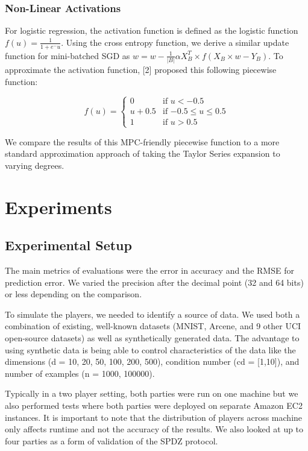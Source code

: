 \documentclass{article}
\begin{document}
\subsubsection{Non-Linear Activations}

For logistic regression, the activation function is defined as the logistic function $f(u) = \frac{1}{1+e^-u}$. Using the cross entropy function, we derive a similar update function for mini-batched SGD as $ w = w - \frac{1}{|B|} \alpha X^{T}_{B} \times f(X_{B} \times w - Y_{B})$. To approximate the activation function, [2] proposed this following piecewise function:

\[
  f(u) =
  \begin{cases}
                                   0 & \text{if $u < -0.5$} \\
                                   u + 0.5 & \text{if $-0.5 \leq u \leq 0.5$} \\
1 & \text{if $u > 0.5$}
  \end{cases}
\]

We compare the results of this MPC-friendly piecewise function to a more standard approximation approach of taking the Taylor Series expansion to varying degrees.

\section{Experiments}

\subsection{Experimental Setup}

The main metrics of evaluations were the error in accuracy and the RMSE for prediction error. We varied the precision after the decimal point (32 and 64 bits) or less depending on the comparison.

To simulate the players, we needed to identify a source of data. We used both a combination of existing, well-known datasets (MNIST, Arcene, and 9 other UCI open-source datasets) as well as synthetically generated data. The advantage to using synthetic data is being able to control characteristics of the data like the dimensions (d = 10, 20, 50, 100, 200, 500), condition number (cd = [1,10]), and number of examples (n = 1000, 100000).

Typically in a two player setting, both parties were run on one machine but we also performed tests where both parties were deployed on separate Amazon EC2 instances. It is important to note that the distribution of players across machine only affects runtime and not the accuracy of the results. We also looked at up to four parties as a form of validation of the SPDZ protocol.
\end{document}
